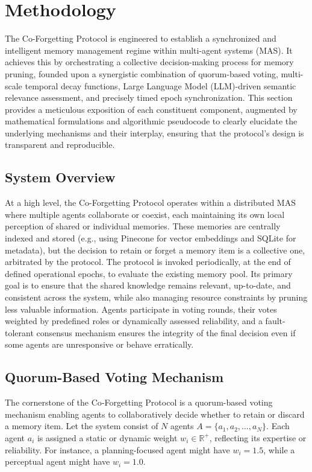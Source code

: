 \documentclass[conference]{IEEEtran}
\begin{document}
\section{Methodology}
\label{sec:methodology}

The Co-Forgetting Protocol is engineered to establish a synchronized and intelligent memory management regime within multi-agent systems (MAS). It achieves this by orchestrating a collective decision-making process for memory pruning, founded upon a synergistic combination of quorum-based voting, multi-scale temporal decay functions, Large Language Model (LLM)-driven semantic relevance assessment, and precisely timed epoch synchronization. This section provides a meticulous exposition of each constituent component, augmented by mathematical formulations and algorithmic pseudocode to clearly elucidate the underlying mechanisms and their interplay, ensuring that the protocol’s design is transparent and reproducible.

\subsection{System Overview}

At a high level, the Co-Forgetting Protocol operates within a distributed MAS where multiple agents collaborate or coexist, each maintaining its own local perception of shared or individual memories. These memories are centrally indexed and stored (e.g., using Pinecone for vector embeddings and SQLite for metadata), but the decision to retain or forget a memory item is a collective one, arbitrated by the protocol. The protocol is invoked periodically, at the end of defined operational epochs, to evaluate the existing memory pool. Its primary goal is to ensure that the shared knowledge remains relevant, up-to-date, and consistent across the system, while also managing resource constraints by pruning less valuable information. Agents participate in voting rounds, their votes weighted by predefined roles or dynamically assessed reliability, and a fault-tolerant consensus mechanism ensures the integrity of the final decision even if some agents are unresponsive or behave erratically.

\subsection{Quorum-Based Voting Mechanism}

The cornerstone of the Co‑Forgetting Protocol is a quorum-based voting mechanism enabling agents to collaboratively decide whether to retain or discard a memory item. Let the system consist of \(N\) agents \(A = \{a_1, a_2, \dots, a_N\}\). Each agent \(a_i\) is assigned a static or dynamic weight \(w_i \in \mathbb{R}^+\), reflecting its expertise or reliability. For instance, a planning-focused agent might have \(w_i = 1.5\), while a perceptual agent might have \(w_i = 1.0\).
\end{document}

